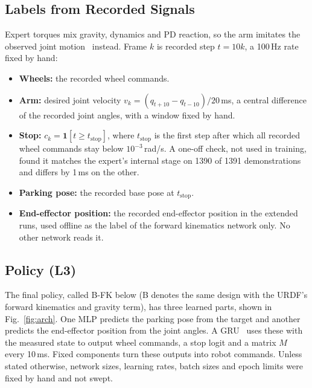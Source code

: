 \documentclass[conference]{IEEEtran}
\begin{document}
\subsection{Labels from Recorded Signals}
Expert torques mix gravity, dynamics and PD reaction, so the arm imitates the observed joint
motion~\cite{torabi2018} instead. Frame $k$ is recorded step $t=10k$, a 100\,Hz rate fixed by hand:
\begin{itemize}
    \item \textbf{Wheels:} the recorded wheel commands.
    \item \textbf{Arm:} desired joint velocity $v_k=(q_{t+10}-q_{t-10})/20$\,ms, a central difference of the
    recorded joint angles, with a window fixed by hand.
    \item \textbf{Stop:} $c_k=\mathbf{1}[t\ge t_\text{stop}]$, where $t_\text{stop}$ is the first step after
    which all recorded wheel commands stay below $10^{-3}$\,rad/s. A one-off check, not used in training, found it
    matches the expert's internal stage on 1390 of 1391 demonstrations and differs by 1\,ms on the other.
    \item \textbf{Parking pose:} the recorded base pose at $t_\text{stop}$.
    \item \textbf{End-effector position:} the recorded end-effector position in the extended runs, used
    offline as the label of the forward kinematics network only. No other network reads it.
\end{itemize}

\subsection{Policy (L3)}\label{sec:policy}
The final policy, called B-FK below (B denotes the same design with the URDF's forward kinematics and
gravity term), has three learned parts, shown in Fig.~\ref{fig:arch}. One MLP predicts the parking pose from the
target and another predicts the end-effector position from the joint angles. A GRU~\cite{cho2014} uses these with
the measured state to output wheel commands, a stop logit and a matrix $M$ every 10\,ms. Fixed components turn
these outputs into robot commands. Unless stated otherwise, network sizes, learning rates, batch sizes and epoch
limits were fixed by hand and not swept.
\end{document}
